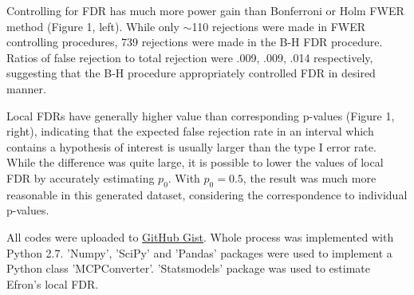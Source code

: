 \documentclass[a4paper, 11pt, oneside]{article}
\begin{document}
Controlling for FDR has much more power gain than Bonferroni or Holm FWER method (Figure 1, left). While only $\sim$110 rejections were made in FWER controlling procedures, 739 rejections were made in the B-H FDR procedure. Ratios of false rejection to total rejection were .009, .009, .014 respectively, suggesting that the B-H procedure appropriately controlled FDR in desired manner. \par
    Local FDRs have generally higher value than corresponding p-values (Figure 1, right), indicating that the expected false rejection rate in an interval which contains a hypothesis of interest is usually larger than the type I error rate. While the difference was quite large, it is possible to lower the values of local FDR by accurately estimating $p_0$. With $p_0=0.5$, the result was much more reasonable in this generated dataset, considering the correspondence to individual p-values. \par
    All codes were uploaded to \href{https://gist.github.com/naturale0/3915e2def589553e91dce99e69d138cc}{GitHub Gist}. Whole process was implemented with Python 2.7. 'Numpy', 'SciPy' and 'Pandas' packages were used to implement a Python class 'MCPConverter'. 'Statsmodels' package was used to estimate Efron's local FDR.

\pagebreak
\end{document}
